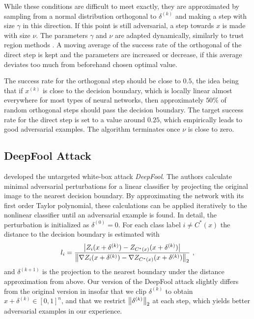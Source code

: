 While these conditions are difficult to meet exactly, they are approximated by sampling from a normal distribution orthogonal to $\delta^{(k)}$ and making a step with size $\gamma$ in this direction.
If this point is still adversarial, a step towards $x$ is made with size $\nu$.
The parameters $\gamma$ and $\nu$ are adapted dynamically, similarly to trust region methods \citep{trustregion}.
A moving average of the success rate of the orthogonal of the direct step is kept and the parameters are increased or decrease, if this average deviates too much from beforehand chosen optimal value.

The success rate for the orthogonal step should be close to $0.5$, the idea being that if $x^{(k)}$ is close to the decision boundary, which is locally linear almost everywhere for most types of neural networks, then approximately $50\%$ of random orthogonal steps should pass the decision boundary. 
The target success rate for the direct step is set to a value around $0.25$, which empirically leads to good adversarial examples.
The algorithm terminates once $\nu$ is close to zero.

\subsection{DeepFool Attack}

\citet{deepfool} developed the untargeted white-box attack \emph{DeepFool}.
The authors calculate minimal adversarial perturbations for a linear classifier by projecting the original image to the nearest decision boundary.
By approximating the network with its first order Taylor polynomial, these calculations can be applied iteratively to the nonlinear classifier until an adversarial example is found.
In detail, the perturbation is initialized as $\delta^{(0)} = 0$.
For each class label $i \neq C^*(x)$ the distance to the decision boundary is estimated with
\begin{equation}
l_i = 
\frac{
	\left \lvert Z_i(x + \delta^{(k)}) - Z_{C^*(x)}(x + \delta^{(k)}) \right \rvert
}
{
	\left \lVert \nabla Z_i(x + \delta^{(k)}) - \nabla Z_{C^*(x)}(x + \delta^{(k)}) \right \rVert _{2}
}
\text{ ,}
\end{equation}
and $\delta^{(k+1)}$ is the projection to the nearest boundary under the distance approximation from above.
Our version of the DeepFool attack slightly differs from the original version in insofar that we clip $\delta^{(k)}$ to obtain $x + \delta^{(k)} \in [0,1]^n$, and that we restrict $\left \lVert \delta^{(k)} \right \rVert _{2}$ at each step, which yields better adversarial examples in our experience.

